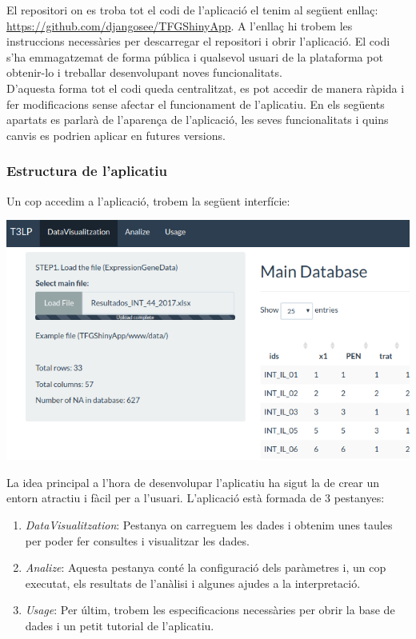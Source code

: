 \documentclass[english]{article}
\begin{document}
\newpage
El repositori on es troba tot el codi de l'aplicació el tenim al següent enlla\c{c}: \url{https://github.com/djangosee/TFGShinyApp}.
A l'enlla\c{c} hi trobem les instruccions necessàries per descarregar el repositori i obrir l'aplicació. El codi s'ha emmagatzemat de forma pública i qualsevol usuari de la plataforma pot obtenir-lo i treballar desenvolupant noves funcionalitats.
\\

D'aquesta forma tot el codi queda centralitzat, es pot accedir de manera ràpida i fer modificacions sense afectar el funcionament de l'aplicatiu. En els següents apartats es parlarà de l'aparen\c{c}a de l'aplicació, les seves funcionalitats i quins canvis es podrien aplicar en futures versions.
\subsubsection{Estructura de l'aplicatiu}
Un cop accedim a l'aplicació, trobem la següent interfície:
\begin{center}
\includegraphics[scale=0.3]{app1.png}
\end{center}

La idea principal a l'hora de desenvolupar l'aplicatiu ha sigut la de crear un entorn atractiu i fàcil per a l'usuari. L'aplicació està formada de 3 pestanyes:
\begin{enumerate}
\item \textit{DataVisualitzation}: Pestanya on carreguem les dades i obtenim unes taules per poder fer consultes i visualitzar les dades.
\item \textit{Analize}: Aquesta pestanya conté la configuració dels paràmetres i, un cop executat, els resultats de l'anàlisi i algunes ajudes a la interpretació.
\item \textit{Usage}: Per últim, trobem les especificacions necessàries per obrir la base de dades i un petit tutorial de l'aplicatiu.
\end{enumerate}
\end{document}

